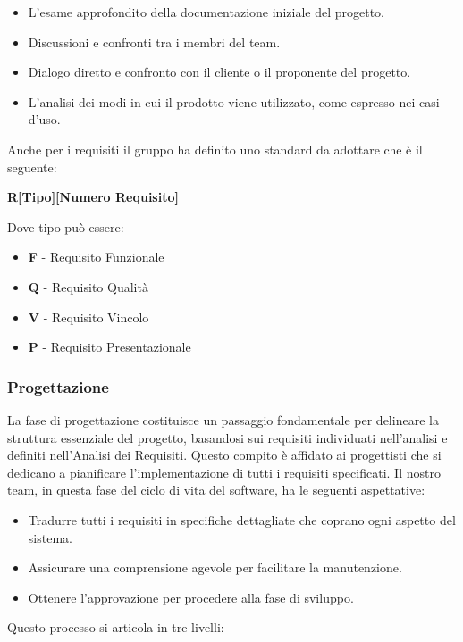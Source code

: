 \documentclass{article}
\begin{document}
\begin{itemize}
    \item L'esame approfondito della documentazione iniziale del progetto.
    \item Discussioni e confronti tra i membri del team.
    \item Dialogo diretto e confronto con il cliente o il proponente del progetto.
    \item L'analisi dei modi in cui il prodotto viene utilizzato, come espresso nei casi d'uso.
\end{itemize}
Anche per i requisiti il gruppo ha definito uno standard da adottare che è il seguente:
\begin{center}
    \textbf{R[Tipo][Numero Requisito]}
\end{center}
Dove tipo può essere: 
\begin{itemize}
    \item \textbf{F} - Requisito Funzionale
    \item \textbf{Q} - Requisito Qualità
    \item \textbf{V} - Requisito Vincolo
    \item \textbf{P} - Requisito Presentazionale
\end{itemize}
\subsubsection{Progettazione}
La fase di progettazione costituisce un passaggio fondamentale per delineare la struttura essenziale del progetto, basandosi sui requisiti individuati nell'analisi e definiti nell'Analisi dei Requisiti. Questo compito è affidato ai progettisti che si dedicano a pianificare l'implementazione di tutti i requisiti specificati. Il nostro team, in questa fase del ciclo di vita del software, ha le seguenti aspettative:

\begin{itemize}
    \item Tradurre tutti i requisiti in specifiche dettagliate che coprano ogni aspetto del sistema.
    \item Assicurare una comprensione agevole per facilitare la manutenzione.
    \item Ottenere l'approvazione per procedere alla fase di sviluppo.
\end{itemize}

Questo processo si articola in tre livelli:
\end{document}
